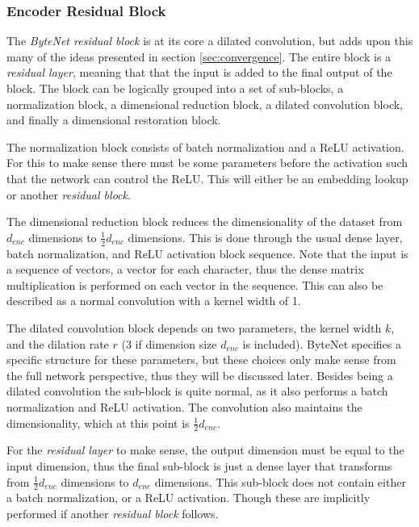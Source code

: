 \subsubsection{Encoder Residual Block}

The \textit{ByteNet residual block} is at its core a dilated convolution, but adds upon this many of the ideas presented in section \ref{sec:convergence}. The entire block is a \textit{residual layer}, meaning that that the input is added to the final output of the block. The block can be logically grouped into a set of sub-blocks, a normalization block, a dimensional reduction block, a dilated convolution block, and finally a dimensional restoration block.

The normalization block consists of batch normalization and a ReLU activation. For this to make sense there must be some parameters before the activation such that the network can control the ReLU. This will either be an embedding lookup or another \textit{residual block}.

The dimensional reduction block reduces the dimensionality of the dataset from $d_{enc}$ dimensions to $\frac{1}{2}d_{enc}$ dimensions. This is done through the usual dense layer, batch normalization, and ReLU activation block sequence. Note that the input is a sequence of vectors, a vector for each character, thus the dense matrix multiplication is performed on each vector in the sequence. This can also be described as a normal convolution with a kernel width of 1.

\afterpage{\clearpage}

The dilated convolution block depends on two parameters, the kernel width $k$, and the dilation rate $r$ (3 if dimension size $d_{enc}$ is included). ByteNet specifies a specific structure for these parameters, but these choices only make sense from the full network perspective, thus they will be discussed later. Besides being a dilated convolution the sub-block is quite normal, as it also performs a batch normalization and ReLU activation. The convolution also maintains the dimensionality, which at this point is $\frac{1}{2}d_{enc}$.

For the \textit{residual layer} to make sense, the output dimension must be equal to the input dimension, thus the final sub-block is just a dense layer that transforms from $\frac{1}{2}d_{enc}$ dimensions to $d_{enc}$ dimensions. This sub-block does not contain either a batch normalization, or a ReLU activation. Though these are implicitly performed if another \textit{residual block} follows.

